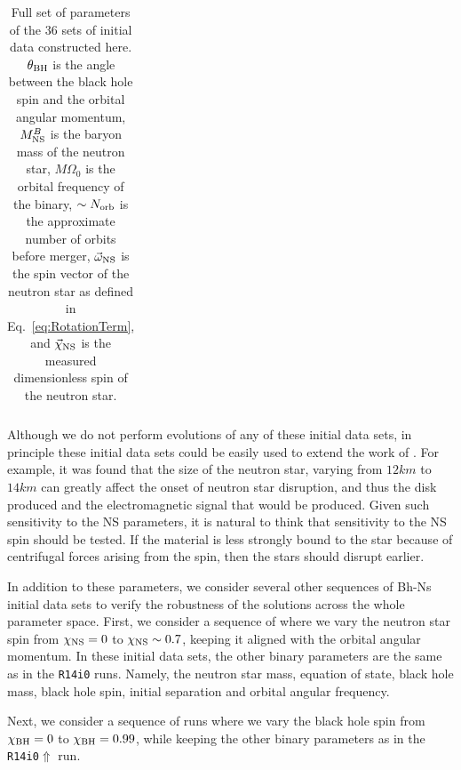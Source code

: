 \begin{longtable}{l|c|c|c|c|c|c}
\caption[Initial data set parameters for series of 36 Bh-Ns initial
data sets.]{\label{tab:FullBHNSParameters}Full set of parameters of
  the 36 sets of initial data constructed here. $\theta_{\rm BH}$ is
  the angle between the black hole spin and the orbital angular
  momentum, $M^B_{\rm NS}$ is the baryon mass of the neutron star,
  $M\Omega_0$ is the orbital frequency of the binary, $\sim N_{\rm
    orb}$ is the approximate number of orbits before merger,
  $\vec{\omega}_{\rm NS}$ is the spin vector of the neutron star as
  defined in Eq.~\ref{eq:RotationTerm}, and $\vec{\chi}_{\rm NS}$ is
  the measured dimensionless spin of the neutron star.}
\end{longtable}

Although we do not perform evolutions of any of these initial data sets, in principle these initial data sets could be easily used to
extend the work of \cite{Foucart:2013a}. For example, it was found
that the size of the neutron star, varying from $12km$ to $14km$ can
greatly affect the onset of neutron star disruption, and thus the disk
produced and the electromagnetic signal that would be produced. Given
such sensitivity to the NS parameters, it is natural to think that
sensitivity to the NS spin should be tested. If the material is less
strongly bound to the star because of centrifugal forces arising from
the spin, then the stars should disrupt earlier.


In addition to these parameters, we consider several other sequences
of Bh-Ns initial data sets to verify the robustness of the solutions across
the whole parameter space. First, we consider a sequence of where we vary the neutron star spin from
$\chi_{\rm NS}=0$ to $\chi_{\rm NS}\sim0.7$, keeping it aligned with the orbital angular momentum. In these initial data sets, the other binary parameters are the same
as in the {\tt R14i0} runs. Namely, the neutron star mass, equation of state, black hole mass, black hole spin, initial separation and orbital angular frequency.

Next, we consider a sequence of runs where we vary the black hole spin
from $\chi_{\rm BH}=0$ to $\chi_{\rm BH}=0.99$, while keeping the other binary parameters as in the {\tt R14i0$\Uparrow$} run.

